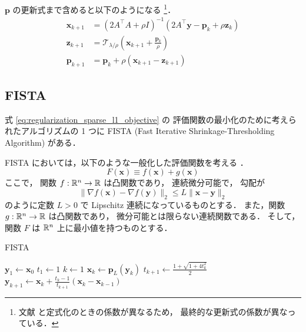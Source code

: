 $\bm{p}$ の更新式まで含めると以下のようになる
\footnote{文献 \cite{Boyd2010} と定式化のときの係数が異なるため，%
    最終的な更新式の係数が異なっている．}．
\begin{align}
    \bm{x}_{k+1} & = (2 A^\top A + \rho I)^{-1} (2 A^\top \bm{y} - \bm{p}_k + \rho \bm{z}_k)
    \\
    \bm{z}_{k+1} & = \mathcal{T}_{\lambda/\rho} \left( \bm{x}_{k+1} + \frac{\bm{p}_k}{\rho} \right)
    \\
    \bm{p}_{k+1} & = \bm{p}_k + \rho (\bm{x}_{k+1} - \bm{z}_{k+1})
\end{align}

\subsection{FISTA}

式 \eqref{eq:regularization_sparse_l1_objective} の
評価関数の最小化のために考えられたアルゴリズムの 1 つに
FISTA (Fast Iterative Shrinkage-Thresholding Algorithm) \cite{Beck2009}
がある．

FISTA においては，以下のような一般化した評価関数を考える \cite{Beck2009}．
\begin{equation}
    F(\bm{x}) \equiv f(\bm{x}) + g(\bm{x})
\end{equation}
ここで，
関数 $f : \mathbb{R}^n \to \mathbb{R}$ は凸関数であり，
連続微分可能で，
勾配が
\begin{equation}
    \|\nabla f(\bm{x}) - \nabla f(\bm{y})\|_2 \le L \|\bm{x} - \bm{y}\|_2
\end{equation}
のように定数 $L > 0$ で Lipschitz 連続になっているものとする．
また，関数 $g : \mathbb{R}^n \to \mathbb{R}$ は凸関数であり，
微分可能とは限らない連続関数である．
そして，関数 $F$ は $\mathbb{R}^n$ 上に最小値を持つものとする．

\begin{algorithm}[t]
    \caption{FISTA \cite{Beck2009}}
    \label{alg:regularization_fista-with-constant-stepsize}
    \begin{algorithmic}[1]
        \State $\bm{y}_1 \gets \bm{x}_0$
        \State $t_1 \gets 1$
        \State $k \gets 1$
        \Loop
        \State $\bm{x}_k \gets \bm{p}_L(\bm{y}_k)$
        \State $t_{k+1} \gets \frac{\displaystyle 1 + \sqrt{1 + 4 t_k^2}}{\displaystyle 2}$
        \State $\bm{y}_{k+1} \gets \bm{x}_k + \frac{\displaystyle t_k - 1}{\displaystyle t_{k+1}} (\bm{x}_k - \bm{x}_{k-1})$
        \EndLoop
        \EndProcedure
    \end{algorithmic}
\end{algorithm}

